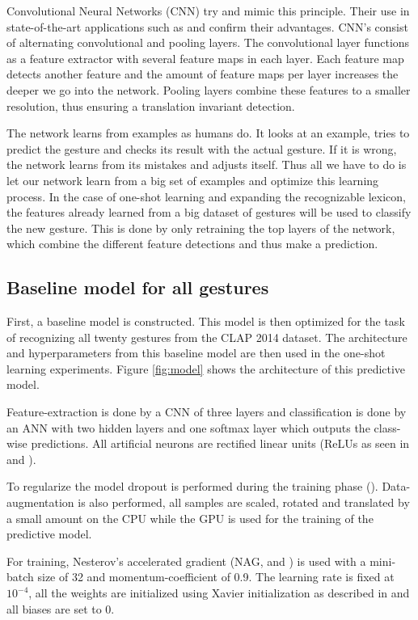 \documentclass[twocolumn]{phdsymp} %
\begin{document}
Convolutional Neural Networks (CNN) try and mimic this principle. Their use in state-of-the-art applications such as \cite{cnn-karpathy} and \cite{krizhevsky2012imagenet} confirm their advantages. CNN's consist of alternating convolutional and pooling layers. The convolutional layer functions as a feature extractor with several feature maps in each layer. Each feature map detects another feature and the amount of feature maps per layer increases the deeper we go into the network. Pooling layers combine these features to a smaller resolution, thus ensuring a translation invariant detection.

The network learns from examples as humans do. It looks at an example, tries to predict the gesture and checks its result with the actual gesture. If it is wrong, the network learns from its mistakes and adjusts itself. Thus all we have to do is let our network learn from a big set of examples and optimize this learning process.
In the case of one-shot learning and expanding the recognizable lexicon, the features already learned from a big dataset of gestures will be used to classify the new gesture. This is done by only retraining the top layers of the network, which combine the different feature detections and thus make a prediction.
\subsection{Baseline model for all gestures}
First, a baseline model is constructed. This model is then optimized for the task of recognizing all twenty gestures from the CLAP 2014 dataset. The architecture and hyperparameters from this baseline model are then used in the one-shot learning experiments. Figure \ref{fig:model} shows the architecture of this predictive model. 

Feature-extraction is done by a CNN of three layers and classification is done by an ANN with two hidden layers and one softmax layer which outputs the class-wise predictions. All artificial neurons are rectified linear units (ReLUs as seen in \cite{ReLU} and \cite{wu_deep_2016}).

To regularize the model dropout is performed during the training phase (\cite{dropout}). Data-augmentation is also performed, all samples are scaled, rotated and translated by a small amount on the CPU while the GPU is used for the training of the predictive model.

For training, Nesterov's accelerated gradient (NAG, \cite{botev_nesterovs_2016} and \cite{sutskever2013importance}) is used with a mini-batch size of 32 and momentum-coefficient of 0.9. The learning rate is fixed at $10^{-4}$, all the weights are initialized using Xavier initialization as described in \cite{glorot-1} and all biases are set to 0.
\end{document}
